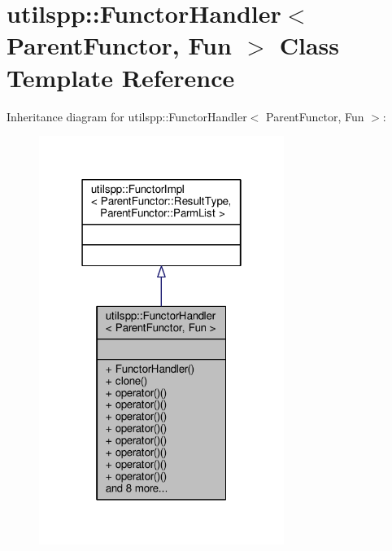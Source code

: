 \hypertarget{classutilspp_1_1FunctorHandler}{\section{utilspp\-:\-:Functor\-Handler$<$ Parent\-Functor, Fun $>$ Class Template Reference}
\label{classutilspp_1_1FunctorHandler}
}


Inheritance diagram for utilspp\-:\-:Functor\-Handler$<$ Parent\-Functor, Fun $>$\-:
\nopagebreak
\begin{figure}[H]
\begin{center}
\leavevmode
\includegraphics[width=226pt]{classutilspp_1_1FunctorHandler__inherit__graph}
\end{center}
\end{figure}


